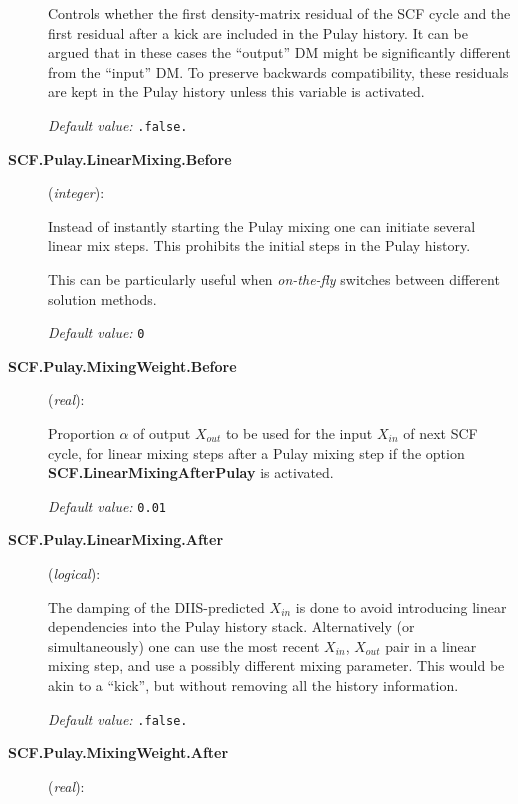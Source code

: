 \begin{description}
Controls whether the first density-matrix residual of the SCF cycle and the first residual
after a kick are included in the Pulay history. It can be argued that in these cases the
``output'' DM might be significantly different from the ``input'' DM. To preserve
backwards compatibility, these residuals are kept in the Pulay history unless this
variable is activated.

\textit{Default value:} \texttt{.false.}

\item[\textbf{SCF.Pulay.LinearMixing.Before}] (\textit{integer}):

Instead of instantly starting the Pulay mixing one can initiate several
linear mix steps. This prohibits the initial steps in the Pulay history.

This can be particularly useful when \emph{on-the-fly} switches between different solution
methods.

\textit{Default value:} \texttt{0}

\item[\textbf{SCF.Pulay.MixingWeight.Before}] (\textit{real}):

Proportion $\alpha$ of output $X_{out}$ to be used for the input
$X_{in}$ of next SCF cycle, for linear mixing steps after a Pulay
mixing step if the option \textbf{SCF.LinearMixingAfterPulay} is
activated.

\textit{Default value:} \texttt{0.01}

\item[\textbf{SCF.Pulay.LinearMixing.After}] (\textit{logical}):

The damping of the DIIS-predicted $X_{in}$ is done to avoid introducing
linear dependencies into the Pulay history stack. Alternatively (or
simultaneously) one can use the most recent $X_{in}$, $X_{out}$ pair in a
linear mixing step, and use a possibly different mixing
parameter. This would be akin to a ``kick'', but without removing all
the history information.

\textit{Default value:} \texttt{.false.}

\item[\textbf{SCF.Pulay.MixingWeight.After}] (\textit{real}):


\end{description}
